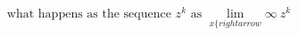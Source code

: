 \documentclass[preview]{standalone}
\begin{document}
\begin{align*}
{\text{what happens as the sequence } z^k \text{ as } \lim_{x \{rightarrow} \infty} \ z^k
\end{align*}
\end{document}
